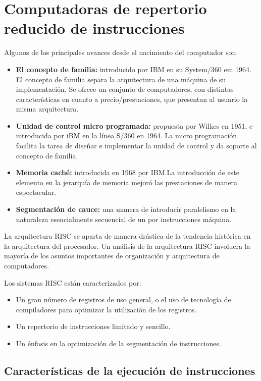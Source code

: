 \section{Computadoras de repertorio reducido de instrucciones}

Algunos de los principales avances desde el nacimiento del computador son:

\begin{itemize}
  \item \textbf{El concepto de familia:} introducido por IBM en su System/360 em 1964. El concepto de familia separa la arquitectura de una máquina de su implementación. Se ofrece un conjunto de computadores, con distintas características en cuanto a precio/prestaciones, que presentan al usuario la misma arquitectura.
  \item \textbf{Unidad de control micro programada:} propuesta por Wilkes en 1951, e introducida por iBM en la línea S/360 en 1964. La micro programación facilita la tarea de diseñar e implementar la unidad de control y da soporte al concepto de familia.
  \item \textbf{Memoria caché:} introducida en 1968 por IBM.\@ La introducción de este elemento en la jerarquía de memoria mejoró las prestaciones de manera espectacular.
  \item \textbf{Segmentación de cauce:} una manera de introducir paralelismo en la naturaleza esencialmente secuencial de un por instrucciones máquina.
\end{itemize}

La arquitectura RISC se aparta de manera drástica de la tendencia histórica en la arquitectura del procesador. Un análisis de la arquitectura RISC involucra la mayoría de los asuntos importantes de organización y arquitectura de computadores.

Los sistemas RISC están caracterizados por:

\begin{itemize}
  \item Un gran número de registros de uso general, o el uso de tecnología de compiladores para optimizar la utilización de los registros.
  \item Un repertorio de instrucciones limitado y sencillo.
  \item Un énfasis en la optimización de la segmentación de instrucciones.
\end{itemize}

\subsection{Características de la ejecución de instrucciones}

